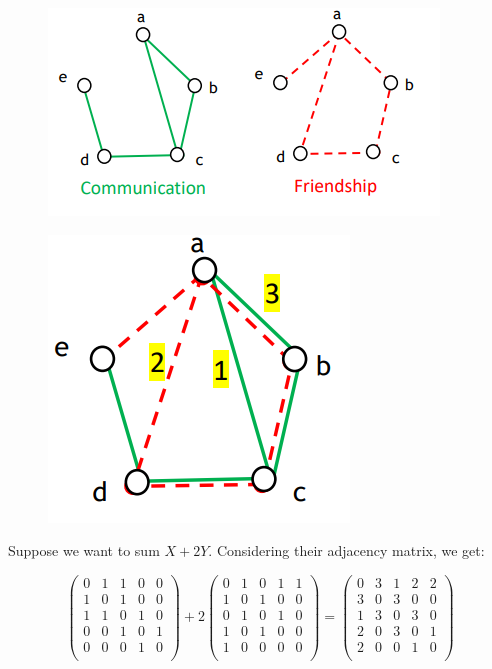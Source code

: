 \documentclass[
  notitlepage,
  onecolumn,
  openany]{book}
\begin{document}
\begin{figure}[h!]

{\centering \includegraphics[width=0.5\linewidth]{images/05-Matrices and Beta centrality/Untitled} 

}

\end{figure}

\begin{figure}[h!]

{\centering \includegraphics[width=0.5\linewidth]{images/05-Matrices and Beta centrality/Untitled 1} 

}

\end{figure}

Suppose we want to sum \(X+2Y\). Considering their adjacency matrix, we get:

\[
\left(  
\begin{array}{ccccc}
0 & 1 & 1 & 0 & 0\\
1 & 0 & 1 & 0 & 0 \\
1 & 1 & 0 & 1 & 0 \\
0 & 0 & 1 & 0 & 1 \\
0 & 0 & 0 & 1 & 0 \\
\end{array}
\right)+2
\left(  
\begin{array}{ccccc}
0 & 1 & 0 & 1 & 1\\
1 & 0 & 1 & 0 & 0 \\
0 & 1 & 0 & 1 & 0 \\
1 & 0 & 1 & 0 & 0 \\
1 & 0 & 0 & 0 & 0 \\
\end{array}
\right) = 
\left(  
\begin{array}{ccccc}
0 & 3 & 1 & 2 & 2\\
3 & 0 & 3 & 0 & 0 \\
1 & 3 & 0 & 3 & 0 \\
2 & 0 & 3 & 0 & 1 \\
2 & 0 & 0 & 1 & 0 \\
\end{array}
\right)
\]
\end{document}
